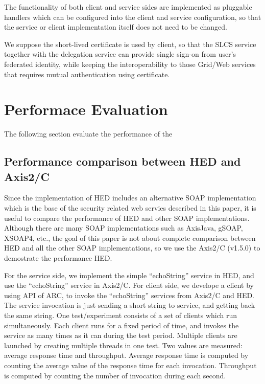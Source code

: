 \documentclass[conference]{IEEEtran}
\begin{document}
The functionality of both client and service sides are implemented as pluggable handlers which can be 
configured into the client and service configuration, so that the service or client implementation itself
does not need to be changed.

We suppose the short-lived certificate is used by client, so that the SLCS service together with
the delegation service can provide single sign-on from user's federated identity, while keeping the 
interoperability to those Grid/Web services that requires mutual authentication using certificate.

\section{Performace Evaluation}
\label{sec:perfeval}
The following section evaluate the performance of the 

\subsection{Performance comparison between HED and Axis2/C}
\label{sec:perhedandaxis}
Since the implementation of HED includes an alternative SOAP implementation which is the base of 
the security related web servies described in this paper, it is useful to compare the performance 
of HED and other SOAP implementations. Although there are many SOAP implementations such as 
AxisJava, gSOAP, XSOAP4, etc., the goal of this paper is not about complete comparison between
HED and all the other SOAP implementations, so we use the Axis2/C (v1.5.0) to demostrate the performance
HED.

For the service side, we implement the simple ``echoString'' service in HED, and use the ``echoString''
service in Axis2/C. For client side, we develope a client by using API of ARC, to invoke the ``echoString''
services from Axis2/C and HED. The service invocation is just sending a short string to service, and 
getting back the same string. One test/experiment consists of a set of clients which run simultaneously. 
Each client runs for a fixed period of time, and invokes the service as many times as it can during 
the test period. Multiple clients are launched by creating multiple threads in one test.
Two values are measured: average response time and throughput. Average response time is computed
by counting the average value of the response time for each invocation. Throughput is computed
by counting the number of invocation during each second.
\end{document}
